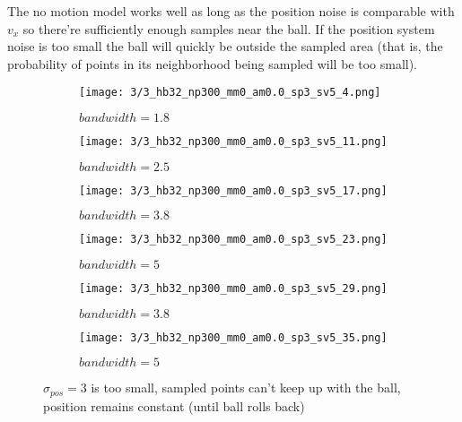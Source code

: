 \documentclass[10pt,a4paper,twoside]{article}
\newcommand{\sweepsize}{0.26}
\begin{document}
The no motion model works well as long as the position noise is comparable with
$v_x$ so there're sufficiently enough samples near the ball.
If the position system noise is too small the ball will quickly be outside the
sampled area (that is, the probability of points in its neighborhood being
sampled will be too small).
\begin{figure}[h]
    \centering
    \begin{subfigure}{\sweepsize\textwidth}
    \texttt{[image: 3/3\_hb32\_np300\_mm0\_am0.0\_sp3\_sv5\_4.png]} 
    \caption{$bandwidth=1.8$}
    \end{subfigure}
    \begin{subfigure}{\sweepsize\textwidth}
    \texttt{[image: 3/3\_hb32\_np300\_mm0\_am0.0\_sp3\_sv5\_11.png]} 
    \caption{$bandwidth=2.5$}
    \end{subfigure}
    \begin{subfigure}{\sweepsize\textwidth}
    \texttt{[image: 3/3\_hb32\_np300\_mm0\_am0.0\_sp3\_sv5\_17.png]} 
    \caption{$bandwidth=3.8$}
    \end{subfigure}
    \begin{subfigure}{\sweepsize\textwidth}
    \texttt{[image: 3/3\_hb32\_np300\_mm0\_am0.0\_sp3\_sv5\_23.png]} 
    \caption{$bandwidth=5$}
    \end{subfigure}
    \begin{subfigure}{\sweepsize\textwidth}
    \texttt{[image: 3/3\_hb32\_np300\_mm0\_am0.0\_sp3\_sv5\_29.png]} 
    \caption{$bandwidth=3.8$}
    \end{subfigure}
    \begin{subfigure}{\sweepsize\textwidth}
    \texttt{[image: 3/3\_hb32\_np300\_mm0\_am0.0\_sp3\_sv5\_35.png]} 
    \caption{$bandwidth=5$}
    \end{subfigure}
    \caption{$\sigma_{pos}=3$ is too small, sampled points can't keep up with
    the ball, position remains constant (until ball rolls back)}
\end{figure}
\end{document}
